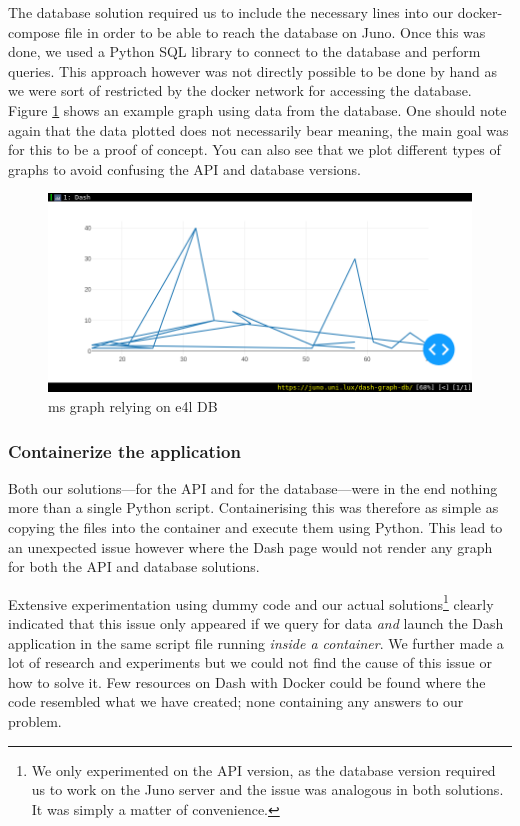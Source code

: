 The database solution required us to include the necessary lines into
our docker-compose file in order to be able to reach the database on
Juno. Once this was done, we used a Python SQL library to connect to
the database and perform queries. This approach however was not
directly possible to be done by hand as we were sort of restricted by
the docker network for accessing the database. Figure
\ref{fig:dash-db} shows an example graph using data from the
database. One should note again that the data plotted does not
necessarily bear meaning, the main goal was for this to be a proof of
concept. You can also see that we plot different types of graphs to
avoid confusing the API and database versions.

\begin{figure}
	\centering
	\includegraphics[width=\linewidth]{images/dash-DB-demo.png}
	\caption{\gls{ms} graph relying on \gls{e4l} DB}
	\label{fig:dash-db}
\end{figure}

\subsubsection{Containerize the application}

Both our solutions---for the API and for the database---were in the
end nothing more than a single Python script. Containerising this was
therefore as simple as copying the files into the container and
execute them using Python. This lead to an unexpected issue however
where the Dash page would not render any graph for both the API and
database solutions.

Extensive experimentation using dummy code and our actual
solutions\footnote{We only experimented on the API version, as the
	database version required us to work on the Juno server and the
	issue was analogous in both solutions. It was simply a matter of
convenience.} clearly indicated that this issue only appeared if we
query for data \emph{and} launch the Dash application in the same
script file running \emph{inside a container}. We further made a lot
of research and experiments but we could not find the cause of this
issue or how to solve it. Few resources on Dash with Docker could be
found where the code resembled what we have created; none containing
any answers to our problem.

